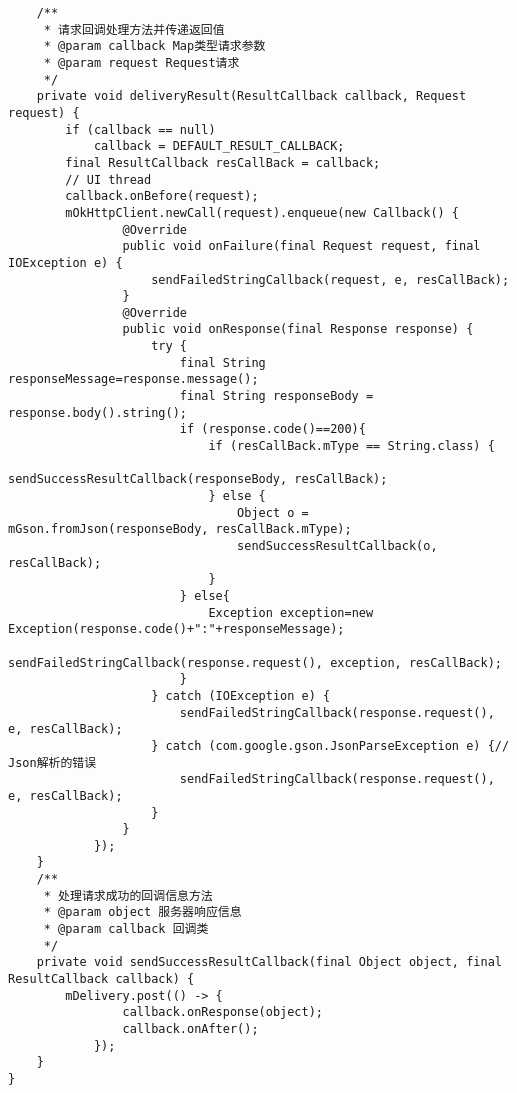 \documentclass[9pt, b5paper]{article}
\begin{document}
\begin{verbatim}
    /**
     * 请求回调处理方法并传递返回值
     * @param callback Map类型请求参数
     * @param request Request请求
     */
    private void deliveryResult(ResultCallback callback, Request request) {
        if (callback == null)
            callback = DEFAULT_RESULT_CALLBACK;
        final ResultCallback resCallBack = callback;
        // UI thread
        callback.onBefore(request);
        mOkHttpClient.newCall(request).enqueue(new Callback() {
                @Override
                public void onFailure(final Request request, final IOException e) {
                    sendFailedStringCallback(request, e, resCallBack);
                }
                @Override
                public void onResponse(final Response response) {
                    try {
                        final String responseMessage=response.message();
                        final String responseBody = response.body().string();
                        if (response.code()==200){
                            if (resCallBack.mType == String.class) {
                                sendSuccessResultCallback(responseBody, resCallBack);
                            } else {
                                Object o = mGson.fromJson(responseBody, resCallBack.mType);
                                sendSuccessResultCallback(o, resCallBack);
                            }
                        } else{
                            Exception exception=new Exception(response.code()+":"+responseMessage);
                            sendFailedStringCallback(response.request(), exception, resCallBack);
                        }
                    } catch (IOException e) {
                        sendFailedStringCallback(response.request(), e, resCallBack);
                    } catch (com.google.gson.JsonParseException e) {// Json解析的错误
                        sendFailedStringCallback(response.request(), e, resCallBack);
                    }
                }
            });
    }
    /**
     * 处理请求成功的回调信息方法
     * @param object 服务器响应信息
     * @param callback 回调类
     */
    private void sendSuccessResultCallback(final Object object, final      ResultCallback callback) {
        mDelivery.post(() -> {
                callback.onResponse(object);
                callback.onAfter();
            });
    }
}
\end{verbatim}
\end{document}
